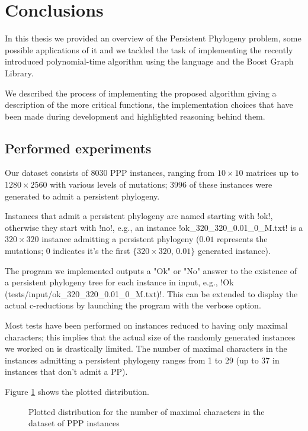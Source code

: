 
\section{Conclusions}\label{section:conclusions}

In this thesis we provided an overview of the Persistent Phylogeny problem, some possible applications of it and we tackled the task of implementing the recently introduced polynomial-time algorithm \cite{PPPptime2016} using the \cc{} language and the Boost Graph Library.

We described the process of implementing the proposed algorithm giving a description of the more critical functions, the implementation choices that have been made during development and highlighted reasoning behind them.

\subsection{Performed experiments}\label{section:experiments}

Our dataset consists of 8030 PPP instances, ranging from $10 \times 10$ matrices up to $1280 \times 2560$ with various levels of mutations; 3996 of these instances were generated to admit a persistent phylogeny.

Instances that admit a persistent phylogeny are named starting with !ok!, otherwise they start with !no!, e.g., an instance !ok_320_320_0.01_0_M.txt! is a $320 \times 320$ instance admitting a persistent phylogeny ($0.01$ represents the mutations; $0$ indicates it's the first $\{ 320 \times 320$, $0.01 \}$ generated instance).

The program we implemented outputs a "Ok" or "No" answer to the existence of a persistent phylogeny tree for each instance in input, e.g., !Ok (tests/input/ok_320_320_0.01_0_M.txt)!.
This can be extended to display the actual c-reductions by launching the program with the verbose option.

Most tests have been performed on instances reduced to having only maximal characters; this implies that the actual size of the randomly generated instances we worked on is drastically limited.
The number of maximal characters in the instances admitting a persistent phylogeny ranges from 1 to 29 (up to 37 in instances that don't admit a PP).

Figure \ref{figure:6} shows the plotted distribution.

\begin{figure}[hp]
  

  \caption{Plotted distribution for the number of maximal characters in the dataset of PPP instances}\label{figure:6}
\end{figure}

